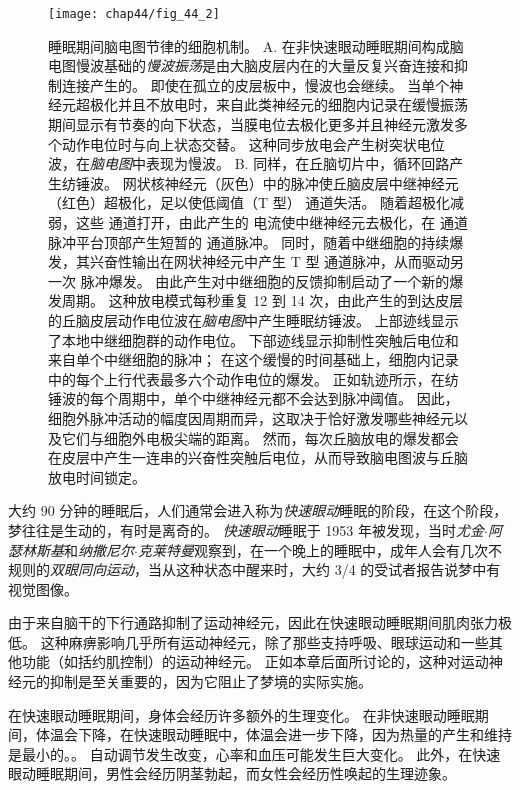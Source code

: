 \begin{figure}[htbp]
	\centering
	\texttt{[image: chap44/fig\_44\_2]}
	\caption{睡眠期间脑电图节律的细胞机制。
		A. 在非快速眼动睡眠期间构成脑电图慢波基础的\textit{慢波振荡}是由大脑皮层内在的大量反复兴奋连接和抑制连接产生的。
		即使在孤立的皮层板中，慢波也会继续。
		当单个神经元超极化并且不放电时，来自此类神经元的细胞内记录在缓慢振荡期间显示有节奏的向下状态，当膜电位去极化更多并且神经元激发多个动作电位时与向上状态交替。
		这种同步放电会产生树突状电位波，在\textit{脑电图}中表现为慢波。
		B. 同样，在丘脑切片中，循环回路产生纺锤波。
		网状核神经元（灰色）中的脉冲使丘脑皮层中继神经元（红色）超极化，足以使低阈值（T 型） 通道失活。
		随着超极化减弱，这些  通道打开，由此产生的  电流使中继神经元去极化，在  通道脉冲平台顶部产生短暂的  通道脉冲。
		同时，随着中继细胞的持续爆发，其兴奋性输出在网状神经元中产生 T 型  通道脉冲，从而驱动另一次  脉冲爆发。
		由此产生对中继细胞的反馈抑制启动了一个新的爆发周期。
		这种放电模式每秒重复 12 到 14 次，由此产生的到达皮层的丘脑皮层动作电位波在\textit{脑电图}中产生睡眠纺锤波。
		上部迹线显示了本地中继细胞群的动作电位。
		下部迹线显示抑制性突触后电位和来自单个中继细胞的脉冲；
		在这个缓慢的时间基础上，细胞内记录中的每个上行代表最多六个动作电位的爆发。
		正如轨迹所示，在纺锤波的每个周期中，单个中继神经元都不会达到脉冲阈值。
		因此，细胞外脉冲活动的幅度因周期而异，这取决于恰好激发哪些神经元以及它们与细胞外电极尖端的距离。
		然而，每次丘脑放电的爆发都会在皮层中产生一连串的兴奋性突触后电位，从而导致脑电图波与丘脑放电时间锁定\cite{bal1995synaptic}。}
	\label{fig:44_2}
\end{figure}


大约 90 分钟的睡眠后，人们通常会进入称为\textit{快速眼动}睡眠的阶段，在这个阶段，梦往往是生动的，有时是离奇的。
\textit{快速眼动}睡眠于 1953 年被发现，当时\textit{尤金$\cdot$阿瑟林斯基}和\textit{纳撒尼尔$\cdot$克莱特曼}观察到，在一个晚上的睡眠中，成年人会有几次不规则的\textit{双眼同向运动}，当从这种状态中醒来时，大约 3/4 的受试者报告说梦中有视觉图像。


由于来自脑干的下行通路抑制了运动神经元，因此在快速眼动睡眠期间肌肉张力极低。
这种麻痹影响几乎所有运动神经元，除了那些支持呼吸、眼球运动和一些其他功能（如括约肌控制）的运动神经元。
正如本章后面所讨论的，这种对运动神经元的抑制是至关重要的，因为它阻止了梦境的实际实施。


在快速眼动睡眠期间，身体会经历许多额外的生理变化。
在非快速眼动睡眠期间，体温会下降，在快速眼动睡眠中，体温会进一步下降，因为热量的产生和维持是最小的。。
自动调节发生改变，心率和血压可能发生巨大变化。
此外，在快速眼动睡眠期间，男性会经历阴茎勃起，而女性会经历性唤起的生理迹象。


